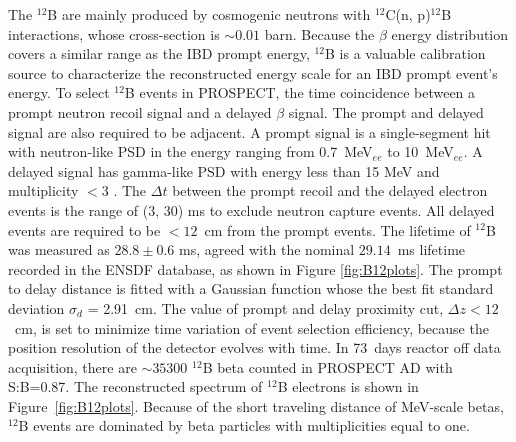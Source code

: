 The $^{12}$B are mainly produced by cosmogenic neutrons with $^{12}$C(n, p)$^{12}$B interactions, whose cross-section is $\sim 0.01$ barn. 
Because the $\beta$ energy distribution covers a similar range as the IBD prompt energy, $^{12}$B is a valuable calibration source to characterize the reconstructed energy scale for an IBD prompt event's energy.
To select $^{12}$B events in PROSPECT, the time coincidence between a prompt neutron recoil signal and a delayed $\beta$ signal.
The prompt and delayed signal are also required to be adjacent.
A prompt signal is a single-segment hit with neutron-like PSD in the energy ranging from 0.7~MeV$_{ee}$ to 10~MeV$_{ee}$.
A delayed signal has gamma-like PSD with energy less than 15 MeV and multiplicity $< 3$ .
The $\Delta t$ between the prompt recoil and the delayed electron events is the range of (3, 30) ms to exclude neutron capture events. 
All delayed events are required to be $<12$~cm from the prompt events. 
The lifetime of $^{12}$B was measured as $28.8\pm0.6$ ms, agreed with the nominal $29.14$~ms lifetime recorded in the ENSDF database, as shown in Figure \ref{fig:B12plots}. 
The prompt to delay distance is fitted with a Gaussian function whose the best fit standard deviation $\sigma_d$ = 2.91~cm.
The value of prompt and delay proximity cut, $\Delta z < 12$~cm, is set to minimize time variation of event selection efficiency, because the position resolution of the detector evolves with time.
In 73~days reactor off data acquisition, there are $\sim 35300$ $^{12}$B beta counted in PROSPECT AD with S:B=0.87. 
The reconstructed spectrum of $^{12}$B electrons is shown in Figure~\ref{fig:B12plots}.
Because of the short traveling distance of MeV-scale betas, $^{12}$B events are dominated by beta particles with multiplicities equal to one.
